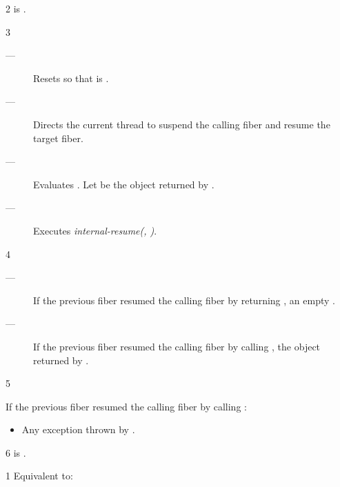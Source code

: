 2 \precond
\canresume is \true.

3 \effects
\begin{description}
    \item[---] Resets \state so that \emptyfn is \true.
    \item[---] Directs the current thread to suspend the calling fiber and resume
               the target fiber.
    \item[---] Evaluates .
               Let  be the \fiber object returned by .
    \item[---] Executes \emph{internal-resume(, )}.
\end{description}

4 \returns

\begin{description}
    \item[---] If the previous fiber resumed the calling fiber by returning ,
          an empty \fiber.
    \item[---] If the previous fiber resumed the calling fiber by
          calling , the \fiber object returned
          by .
\end{description}

5 \except

If the previous fiber resumed the calling fiber by calling :
\begin{itemize}
    \item Any exception thrown by .
\end{itemize}


6 \postcond
\emptyfn is \true.



1 \effects
Equivalent to:\\

